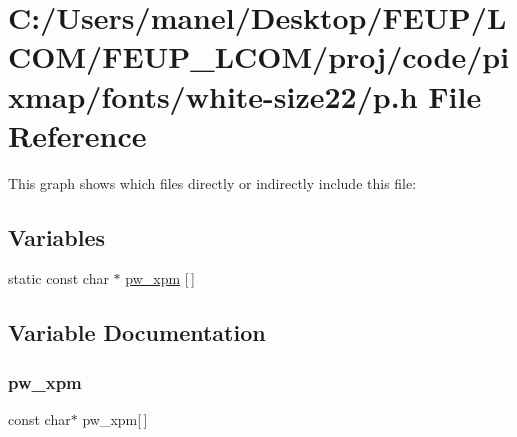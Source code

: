 \hypertarget{white-size22_2p_8h}{}\section{C\+:/\+Users/manel/\+Desktop/\+F\+E\+U\+P/\+L\+C\+O\+M/\+F\+E\+U\+P\+\_\+\+L\+C\+O\+M/proj/code/pixmap/fonts/white-\/size22/p.h File Reference}
\label{white-size22_2p_8h}
This graph shows which files directly or indirectly include this file\+:
\subsection*{Variables}
\begin{DoxyCompactItemize}
\item 
static const char $\ast$ \mbox{\hyperlink{white-size22_2p_8h_a638356e44539607c08b8c4b67c11f54d}{pw\+\_\+xpm}} \mbox{[}$\,$\mbox{]}
\end{DoxyCompactItemize}


\subsection{Variable Documentation}
\mbox{\label{white-size22_2p_8h_a638356e44539607c08b8c4b67c11f54d}} 
\subsubsection{\texorpdfstring{pw\_xpm}{pw\_xpm}}
{\footnotesize\ttfamily const char$\ast$ pw\+\_\+xpm\mbox{[}$\,$\mbox{]}\hspace{0.3cm}{\ttfamily [static]}}

